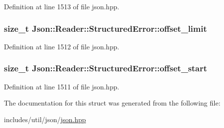 Definition at line 1513 of file json.\-hpp.

\hypertarget{struct_json_1_1_reader_1_1_structured_error_a80747dae744bcc80a9bc81c94fd42e13}{
\subsubsection[{offset\-\_\-limit}]{\setlength{\rightskip}{0pt plus 5cm}size\-\_\-t Json\-::\-Reader\-::\-Structured\-Error\-::offset\-\_\-limit}}\label{struct_json_1_1_reader_1_1_structured_error_a80747dae744bcc80a9bc81c94fd42e13}


Definition at line 1512 of file json.\-hpp.

\hypertarget{struct_json_1_1_reader_1_1_structured_error_a160dae4eb3464a2209b743c755baf65f}{
\subsubsection[{offset\-\_\-start}]{\setlength{\rightskip}{0pt plus 5cm}size\-\_\-t Json\-::\-Reader\-::\-Structured\-Error\-::offset\-\_\-start}}\label{struct_json_1_1_reader_1_1_structured_error_a160dae4eb3464a2209b743c755baf65f}


Definition at line 1511 of file json.\-hpp.



The documentation for this struct was generated from the following file\-:\begin{DoxyCompactItemize}
\item 
includes/util/json/\hyperlink{json_8hpp}{json.\-hpp}\end{DoxyCompactItemize}
